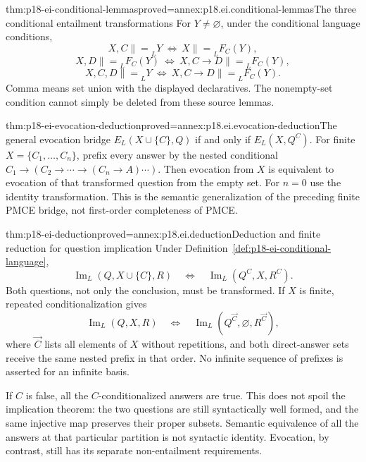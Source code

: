 \begin{hblemma}{thm:p18-ei-conditional-lemmas}{proved=annex:p18.ei.conditional-lemmas}{The three conditional entailment transformations}
For \(Y\ne\varnothing\), under the conditional language conditions,
\[
 X,C\mathrel{\|=}_L Y\ \Longleftrightarrow\ X\mathrel{\|=}_L F_C(Y),
\]
\[
 X,D\mathrel{\|=}_L F_C(Y)\ \Longleftrightarrow\
 X,C\to D\mathrel{\|=}_L F_C(Y),
\]
\[
 X,C,D\mathrel{\|=}_L Y\ \Longleftrightarrow\
 X,C\to D\mathrel{\|=}_L F_C(Y).
\]
Comma means set union with the displayed declaratives. The nonempty-set
condition cannot simply be deleted from these source lemmas.
\end{hblemma}

\begin{hbtheorem}{thm:p18-ei-evocation-deduction}{proved=annex:p18.ei.evocation-deduction}{The general evocation bridge}
\(E_L(X\cup\{C\},Q)\) if and only if \(E_L(X,Q^C)\).
For finite \(X=\{C_1,\ldots,C_n\}\), prefix every answer by the nested
conditional \(C_1\to(C_2\to\cdots\to(C_n\to A)\cdots)\).
Then evocation from \(X\) is equivalent to evocation of that transformed
question from the empty set. For \(n=0\) use the identity transformation.
This is the semantic generalization of the preceding finite PMCE bridge,
not first-order completeness of PMCE.
\end{hbtheorem}

\begin{hbtheorem}{thm:p18-ei-deduction}{proved=annex:p18.ei.deduction}{Deduction and finite reduction for question implication}
Under Definition~\ref{def:p18-ei-conditional-language},
\[
 \operatorname{Im}_L(Q,X\cup\{C\},R)
 \quad\Longleftrightarrow\quad
 \operatorname{Im}_L(Q^C,X,R^C).
\]
Both questions, not only the conclusion, must be transformed. If \(X\) is
finite, repeated conditionalization gives
\[
 \operatorname{Im}_L(Q,X,R)
 \quad\Longleftrightarrow\quad
 \operatorname{Im}_L(Q^{\vec C},\varnothing,R^{\vec C}),
\]
where \(\vec C\) lists all elements of \(X\) without repetitions, and
both direct-answer sets receive the same nested prefix in that order.
No infinite sequence of prefixes is asserted for an infinite basis.
\end{hbtheorem}

If \(C\) is false, all the \(C\)-conditionalized answers are true. This
does not spoil the implication theorem: the two questions are still
syntactically well formed, and the same injective map preserves their proper
subsets. Semantic equivalence of all the answers at that particular partition
is not syntactic identity. Evocation, by contrast, still has its separate
non-entailment requirements.

